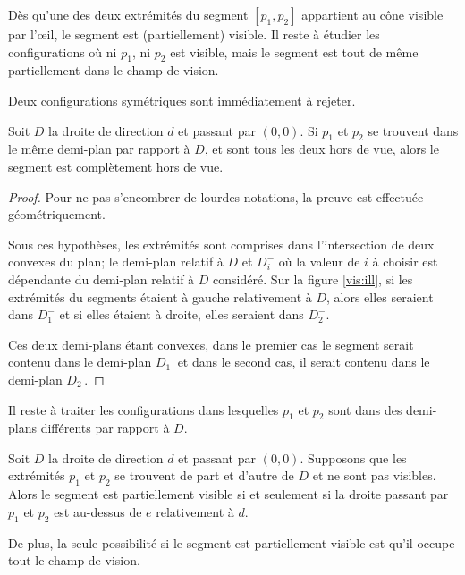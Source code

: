 Dès qu'une des deux extrémités du segment $[p_1, p_2]$ appartient au
cône visible par l'\oe{}il, le segment est (partiellement)
visible. Il reste à étudier les configurations où ni $p_1$, ni $p_2$ est
visible, mais le segment est tout de même partiellement dans le champ de vision.

Deux configurations symétriques sont immédiatement à rejeter.
\begin{obs}
  Soit $D$ la droite de direction $d$ et passant par $(0, 0)$.
  Si $p_1$ et $p_2$ se trouvent dans le même demi-plan par rapport à $D$,
  et sont tous les deux hors de vue, alors le segment est complètement hors de vue.
\end{obs}
\begin{proof}
  Pour ne pas s'encombrer de lourdes notations, la preuve est effectuée
  géométriquement.

  Sous ces hypothèses, les extrémités sont comprises dans l'intersection
  de deux convexes du plan; le demi-plan relatif à $D$ et $D_i^-$ où la valeur
  de $i$ à choisir est dépendante du demi-plan relatif à $D$ considéré.
  Sur la figure \ref{vis:ill}, si les extrémités du segments étaient
  à gauche relativement à $D$, alors elles seraient dans $D_1^-$ et
  si elles étaient à droite, elles seraient dans $D_2^-$.

  Ces deux demi-plans étant convexes, dans le premier cas le
  segment serait contenu dans le demi-plan $D_1^-$ et dans le second
  cas, il serait contenu dans le demi-plan $D_2^-$.
\end{proof}

Il reste à traiter les configurations dans lesquelles $p_1$
et $p_2$ sont dans des demi-plans différents par rapport à $D$.

\begin{obs}
  Soit $D$ la droite de direction $d$ et passant par $(0, 0)$.
  Supposons que les extrémités $p_1$ et $p_2$ se trouvent
  de part et d'autre de $D$ et ne sont pas visibles.
  Alors le segment est partiellement visible
  si et seulement si la droite passant par $p_1$
  et $p_2$ est \og au-dessus\fg{} de $e$ relativement à $d$.

  De plus, la seule possibilité si le segment est partiellement
  visible est qu'il occupe tout le champ de vision.
\end{obs}

